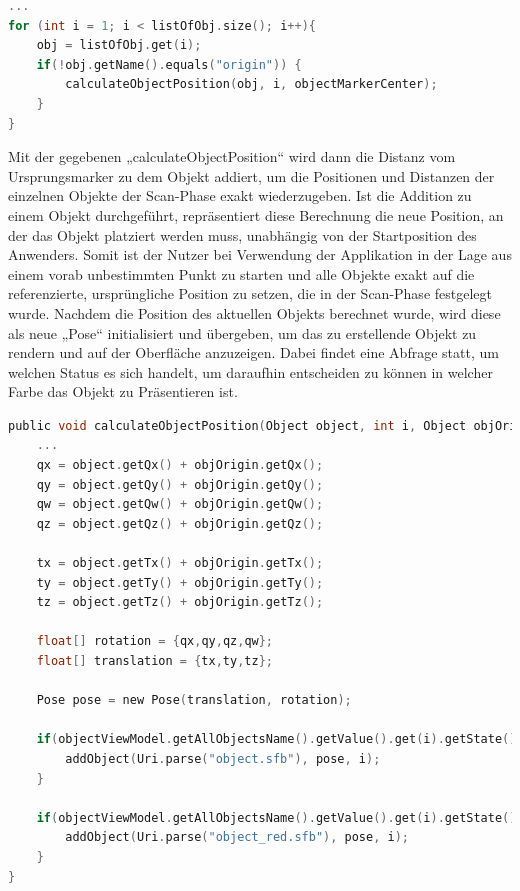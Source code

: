 \linebreak
\begin{lstlisting}[language=C,
    frame=lines,           % Ein Rahmen um den Code (single for box, lines for top and bottom)
    xleftmargin=\parindent,  % Rahmen link von den Zahlen
    style=algoBericht,
    label={code:listOfObjects},
    captionpos=b,           % Caption unter den Code setzen
caption={Abfolge der Objekte in der Liste}]
... 
for (int i = 1; i < listOfObj.size(); i++){
    obj = listOfObj.get(i);
    if(!obj.getName().equals("origin")) {
        calculateObjectPosition(obj, i, objectMarkerCenter);
    }
}
\end{lstlisting}
Mit der gegebenen „calculateObjectPosition“ wird dann die Distanz vom Ursprungsmarker zu dem Objekt addiert, um 
die Positionen und Distanzen der einzelnen Objekte der Scan-Phase exakt wiederzugeben. Ist die Addition zu einem Objekt durchgeführt, repräsentiert diese 
Berechnung die neue Position, an der das Objekt platziert werden muss, unabhängig von der Startposition des Anwenders. Somit ist der Nutzer bei Verwendung der 
Applikation in der Lage aus einem vorab unbestimmten Punkt zu starten und alle Objekte exakt auf die referenzierte, ursprüngliche Position zu setzen, die 
in der Scan-Phase festgelegt wurde. Nachdem die Position des aktuellen Objekts berechnet wurde, wird diese als neue „Pose“ initialisiert und übergeben, um 
das zu erstellende Objekt zu rendern und auf der Oberfläche anzuzeigen. Dabei findet eine Abfrage statt, um welchen Status es sich handelt, um daraufhin 
entscheiden zu können in welcher Farbe das Objekt zu Präsentieren ist.  
\\ 
\linebreak
\begin{lstlisting}[language=C,
    frame=lines,           % Ein Rahmen um den Code (single for box, lines for top and bottom)
    xleftmargin=\parindent,  % Rahmen link von den Zahlen
    style=algoBericht,
    label={code:additionOfObject},
    captionpos=b,           % Caption unter den Code setzen
caption={Berechnung der Markerplatzierung}]
public void calculateObjectPosition(Object object, int i, Object objOrigin){
    ... 
    qx = object.getQx() + objOrigin.getQx();
    qy = object.getQy() + objOrigin.getQy();
    qw = object.getQw() + objOrigin.getQw();
    qz = object.getQz() + objOrigin.getQz();

    tx = object.getTx() + objOrigin.getTx();
    ty = object.getTy() + objOrigin.getTy();
    tz = object.getTz() + objOrigin.getTz();

    float[] rotation = {qx,qy,qz,qw};
    float[] translation = {tx,ty,tz};

    Pose pose = new Pose(translation, rotation);

    if(objectViewModel.getAllObjectsName().getValue().get(i).getState() == 1) {
        addObject(Uri.parse("object.sfb"), pose, i);
    }

    if(objectViewModel.getAllObjectsName().getValue().get(i).getState() == -1){
        addObject(Uri.parse("object_red.sfb"), pose, i);
    }
}
\end{lstlisting}
